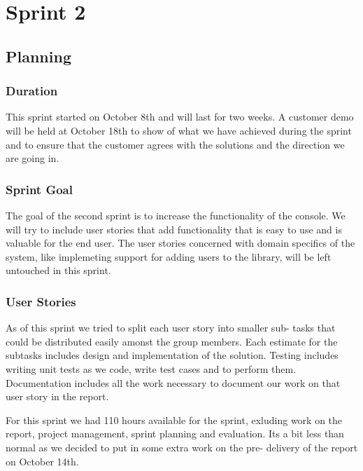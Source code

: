 \chapter{Sprint 2}
\section{Planning}

\subsection{Duration}
This sprint started on October 8th and will last for two weeks. A customer demo will be held at October 18th to show of what we have achieved during the sprint and to ensure that the customer agrees with the solutions  and the direction we are going in.

\subsection{Sprint Goal}
The goal of the second sprint is to increase the functionality of the console. We will try to include user stories that add functionality that is easy to use and is valuable for the end user. The user stories concerned with domain specifics of the system, like implemeting support for adding users to the library, will be left untouched in this sprint.

\subsection{User Stories}
As of this sprint we tried to split each user story into smaller sub- tasks that could be distributed easily amonst the group members. Each estimate for the subtasks includes design and implementation of the solution. Testing includes writing unit tests as we code, write test cases and to perform them. Documentation includes all the work necessary to document our work on that user story in the report.

For this sprint we had 110 hours available for the sprint, exluding work on the report, project management, sprint planning and evaluation. Its a bit less than normal as we decided to put in some extra work on the pre- delivery of the report on October 14th.

